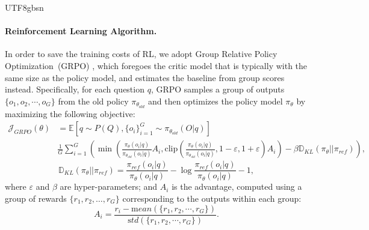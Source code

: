 \documentclass[11pt, a4paper, logo, copyright, nonumbering]{deepseek}
\renewcommand{\epsilon}{\varepsilon}
\begin{document}
\begin{CJK*}{UTF8}{gbsn}
\paragraph{Reinforcement Learning Algorithm.}
In order to save the training costs of RL, we adopt Group Relative Policy Optimization~(GRPO) \citep{deepseekmath}, which foregoes the critic model that is typically with the same size as the policy model, and estimates the baseline from group scores instead. 
Specifically, for each question $q$, GRPO samples a group of outputs $\{o_1, o_2, \cdots, o_G\}$ from the old policy $\pi_{\theta_{old}}$ and then optimizes the policy model $\pi_{\theta}$ by maximizing the following objective:
\begin{equation}
\begin{split}
    \mathcal{J}_{GRPO}(\theta) &= \mathbb{E}{[q \sim P(Q), \{o_i\}_{i=1}^G \sim \pi_{\theta_{old}}(O|q)]}  \\
    & \frac{1}{G}\sum_{i=1}^G \left( \min \left( \frac{\pi_\theta(o_i |q)}{\pi_{\theta_{old}}(o_i |q)} A_i, \text{clip} \left( \frac{\pi_\theta(o_i |q)}{\pi_{\theta_{old}}(o_i |q)}, 1 - \epsilon, 1 + \epsilon \right)  A_i \right) - \beta \mathbb{D}_{KL}\left(\pi_{\theta} || \pi_{ref}\right)\right) ,
\end{split}
\label{eq:GRPO-obj}
\end{equation}
\begin{equation}
    \mathbb{D}_{KL}\left(\pi_{\theta} || \pi_{ref}\right) = \frac{\pi_{ref}(o_i|q)}{\pi_{\theta}(o_i|q)}- \log\frac{\pi_{ref}(o_i|q)}{\pi_{\theta}(o_i|q)} - 1,
\end{equation}
where $\epsilon$ and $\beta$ are hyper-parameters; 
and $A_i$ is the advantage, computed using a group of rewards $\{r_1, r_2, \ldots, r_G\}$ corresponding to the outputs within each group:
\begin{equation}
    A_i = \frac{r_i - {\mathrm mean(\{r_1, r_2, \cdots, r_G\})}}{{\mathrm std(\{r_1, r_2, \cdots, r_G\})}}.
\end{equation}


\end{CJK*}
\end{document}
